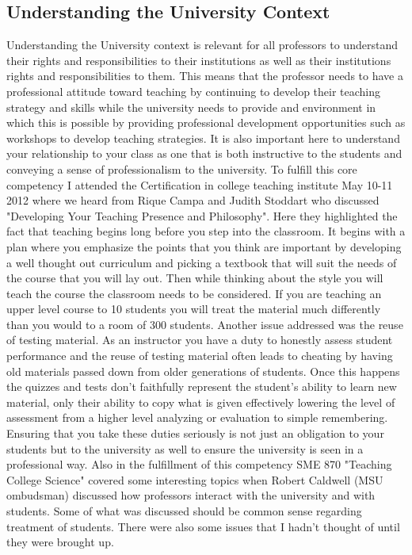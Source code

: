 \documentclass{article}
\begin{document}
\subsection{Understanding the University Context}
\hspace{0.5cm}Understanding the University context is relevant for all professors to understand their rights and responsibilities to their institutions as well as their institutions rights and responsibilities to them. This means that the professor needs to have a professional attitude toward teaching by continuing to develop their teaching strategy and skills while the university needs to provide and environment in which this is possible by providing professional development opportunities such as workshops to develop teaching strategies. It is also important here to understand your relationship to your class as one that is both instructive to the students and conveying a sense of professionalism to the university. 
To fulfill this core competency I attended the Certification in college teaching institute May 10-11 2012 where we heard from Rique Campa and Judith Stoddart who discussed "Developing Your Teaching Presence and Philosophy". Here they highlighted the fact that teaching begins long before you step into the classroom. It begins with a plan where you emphasize the points that you think are important by developing a well thought out curriculum and picking a textbook that will suit the needs of the course that you will lay out. Then while thinking about the style you will teach the course the classroom needs to be considered. If you are teaching an upper level course to 10 students you will treat the material much differently than you would to a room of 300 students. Another issue addressed was the reuse of testing material. As an instructor you have a duty to honestly assess student performance and the reuse of testing material often leads to cheating by having old materials passed down from older generations of students. Once this happens the quizzes and tests don't faithfully represent the student’s ability to learn new material, only their ability to copy what is given effectively lowering the level of assessment from a higher level analyzing or evaluation to simple remembering. Ensuring that you take these duties seriously is not just an obligation to your students but to the university as well to ensure the university is seen in a professional way. 
Also in the fulfillment of this competency SME 870 "Teaching College Science" covered some interesting topics when Robert Caldwell (MSU ombudsman) discussed how professors interact with the university and with students. Some of what was discussed should be common sense regarding treatment of students. There were also some issues that I hadn't thought of until they were brought up. 
\end{document}
